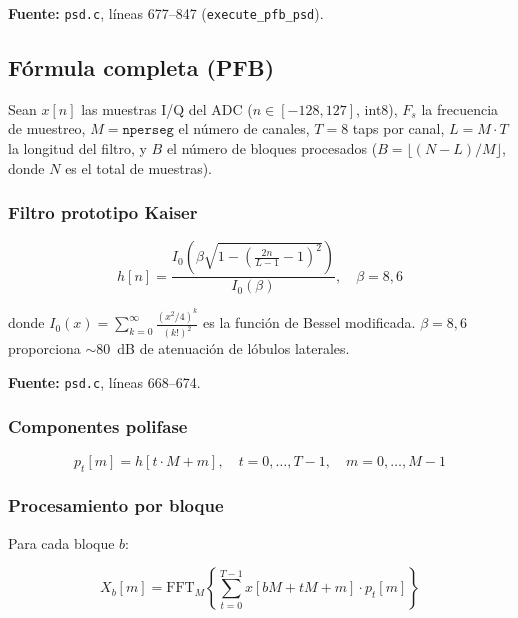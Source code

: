 \documentclass[11pt,a4paper]{article}
\begin{document}
\textbf{Fuente:} \texttt{psd.c}, líneas 677--847 (\texttt{execute\_pfb\_psd}).

\subsection{Fórmula completa (PFB)}

Sean $x[n]$ las muestras I/Q del ADC ($n \in [-128, 127]$, int8), $F_s$ la frecuencia de muestreo, $M = \texttt{nperseg}$ el número de canales, $T = 8$ taps por canal, $L = M \cdot T$ la longitud del filtro, y $B$ el número de bloques procesados ($B = \lfloor(N - L)/M\rfloor$, donde $N$ es el total de muestras).

\subsubsection{Filtro prototipo Kaiser}

\begin{equation}
h[n] = \frac{I_0\!\left(\beta \sqrt{1 - \left(\frac{2n}{L-1} - 1\right)^2}\right)}{I_0(\beta)}, \quad \beta = 8{,}6
\label{eq:kaiser}
\end{equation}

donde $I_0(x) = \sum_{k=0}^{\infty} \frac{(x^2/4)^k}{(k!)^2}$ es la función de Bessel modificada. $\beta = 8{,}6$ proporciona $\sim 80$~dB de atenuación de lóbulos laterales.

\textbf{Fuente:} \texttt{psd.c}, líneas 668--674.

\subsubsection{Componentes polifase}

\begin{equation}
p_t[m] = h[t \cdot M + m], \quad t = 0, \ldots, T{-}1, \quad m = 0, \ldots, M{-}1
\label{eq:polyphase}
\end{equation}

\subsubsection{Procesamiento por bloque}

Para cada bloque $b$:

\begin{equation}
X_b[m] = \text{FFT}_M \left\{ \sum_{t=0}^{T-1} x[bM + tM + m] \cdot p_t[m] \right\}
\label{eq:pfb_block}
\end{equation}
\end{document}
